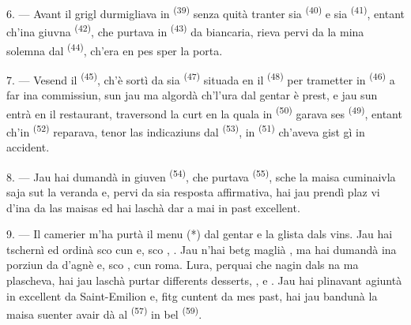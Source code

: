 \VUsaut{4.0mm}
\VUsaut{3.0mm}

6. --- Avant il grigl durmigliava in  \textsuperscript{(39)} senza
quità tranter sia  \textsuperscript{(40)} e sia  \textsuperscript{(41)}, entant ch'ina giuvna
 \textsuperscript{(42)},
che purtava in  \textsuperscript{(43)} da biancaria, rieva pervi da la
mina solemna dal  \textsuperscript{(44)}, ch'era en pes sper la
porta.

7. --- Vesend il  \textsuperscript{(45)}, ch'è sortì da sia
 \textsuperscript{(47)} situada en il  \textsuperscript{(48)}
per trametter in  \textsuperscript{(46)} a far ina commissiun,
sun jau ma algordà ch'l'ura dal gentar è prest, e jau sun entrà en il restaurant,
traversond la curt en la quala in  \textsuperscript{(50)} garava ses
 \textsuperscript{(49)}, entant ch'in  \textsuperscript{(52)}
reparava, tenor las indicaziuns dal  \textsuperscript{(53)}, in
 \textsuperscript{(51)} ch'aveva gist gì in accident.

8. --- Jau hai dumandà in giuven  \textsuperscript{(54)}, che purtava
 \textsuperscript{(55)}, sche la maisa cuminaivla saja sut la
veranda e, pervi da sia resposta affirmativa, hai jau prendì plaz vi d'ina da las
maisas ed hai laschà dar a mai in past excellent.


\VUsaut{4.0mm}
\VUsaut{3.0mm}

9. --- Il camerier m'ha purtà il menu (*) dal gentar e la glista dals vins. Jau hai
tschernì ed ordinà sco  cun  e, sco
, . Jau n'hai betg maglià
, ma hai dumandà ina porziun da  d'agnè e, sco ,  cun roma. Lura, perquai che nagin dals 
na ma plascheva, hai jau laschà purtar differents desserts, ,
 e . Jau hai plinavant agiuntà in excellent
 da Saint-Emilion e, fitg cuntent da mes past, hai jau bandunà la maisa
suenter avair dà al  \textsuperscript{(57)} in bel 
\textsuperscript{(59)}.


